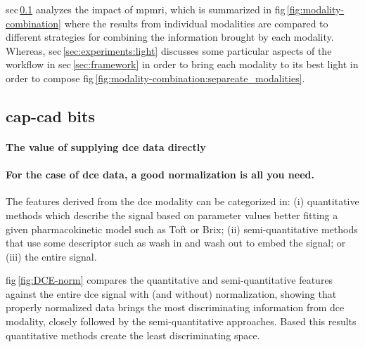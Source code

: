 \documentclass[num-refs]{wiley-article}
\begin{document}
\Acl{sec}\,\ref{sec:experiments:mpmri-comparison} analyzes the impact of \ac{mpmri}, which
is summarized in \Ac{fig}\,\ref{fig:modality-combination} where the results from
individual modalities are compared to different strategies for combining the
information brought by each modality.
Whereas, \ac{sec}\,\ref{sec:experiments:light} discusses some particular aspects
of the workflow in \Ac{sec}\,\ref{sec:framework} in order to bring each
modality to its best light in order to compose \Ac{fig}\,\ref{fig:modality-combination:separeate_modalities}.

\subsection{\ac{cap}-\ac{cad} bits}
\label{sec:experiments:mpmri-comparison}
\paragraph{The value of supplying \ac{dce} data directly}
\paragraph{For the case of \ac{dce} data, a good normalization is all you need.}

The features derived from the \ac{dce} modality can be categorized in: 
(i) quantitative methods which describe the signal based on parameter values
better fitting a given pharmacokinetic model such as Toft or Brix;
(ii) semi-quantitative methods that use some descriptor such as wash in and wash
out to embed the signal;
or (iii) the entire signal.

%
\Acl{fig}\,\ref{fig:DCE-norm} compares the quantitative and semi-quantitative
features against the entire \ac{dce} signal with (and without) normalization,
showing that properly normalized data brings the most discriminating information
from \ac{dce} modality, closely followed by the semi-quantitative approaches.
Based this results quantitative methods create the least discriminating space.
\end{document}

